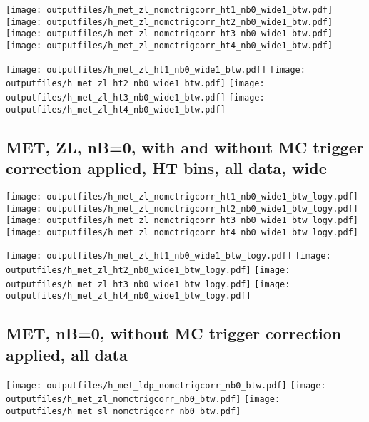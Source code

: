 \documentclass[11pt]{article}
\begin{document}
    \noindent
     \texttt{[image: outputfiles/h\_met\_zl\_nomctrigcorr\_ht1\_nb0\_wide1\_btw.pdf]}
     \texttt{[image: outputfiles/h\_met\_zl\_nomctrigcorr\_ht2\_nb0\_wide1\_btw.pdf]}
     \texttt{[image: outputfiles/h\_met\_zl\_nomctrigcorr\_ht3\_nb0\_wide1\_btw.pdf]}
     \texttt{[image: outputfiles/h\_met\_zl\_nomctrigcorr\_ht4\_nb0\_wide1\_btw.pdf]}

    \noindent
     \texttt{[image: outputfiles/h\_met\_zl\_ht1\_nb0\_wide1\_btw.pdf]}
     \texttt{[image: outputfiles/h\_met\_zl\_ht2\_nb0\_wide1\_btw.pdf]}
     \texttt{[image: outputfiles/h\_met\_zl\_ht3\_nb0\_wide1\_btw.pdf]}
     \texttt{[image: outputfiles/h\_met\_zl\_ht4\_nb0\_wide1\_btw.pdf]}

    \clearpage
     \subsection{ MET, ZL, nB=0, with and without MC trigger correction applied, HT bins, all data, wide}

    \noindent
     \texttt{[image: outputfiles/h\_met\_zl\_nomctrigcorr\_ht1\_nb0\_wide1\_btw\_logy.pdf]}
     \texttt{[image: outputfiles/h\_met\_zl\_nomctrigcorr\_ht2\_nb0\_wide1\_btw\_logy.pdf]}
     \texttt{[image: outputfiles/h\_met\_zl\_nomctrigcorr\_ht3\_nb0\_wide1\_btw\_logy.pdf]}
     \texttt{[image: outputfiles/h\_met\_zl\_nomctrigcorr\_ht4\_nb0\_wide1\_btw\_logy.pdf]}


    \noindent
     \texttt{[image: outputfiles/h\_met\_zl\_ht1\_nb0\_wide1\_btw\_logy.pdf]}
     \texttt{[image: outputfiles/h\_met\_zl\_ht2\_nb0\_wide1\_btw\_logy.pdf]}
     \texttt{[image: outputfiles/h\_met\_zl\_ht3\_nb0\_wide1\_btw\_logy.pdf]}
     \texttt{[image: outputfiles/h\_met\_zl\_ht4\_nb0\_wide1\_btw\_logy.pdf]}


   \clearpage
    \subsection{ MET, nB=0, without MC trigger correction applied, all data}

    \noindent
    \texttt{[image: outputfiles/h\_met\_ldp\_nomctrigcorr\_nb0\_btw.pdf]}
    \texttt{[image: outputfiles/h\_met\_zl\_nomctrigcorr\_nb0\_btw.pdf]}
    \texttt{[image: outputfiles/h\_met\_sl\_nomctrigcorr\_nb0\_btw.pdf]}
\end{document}
